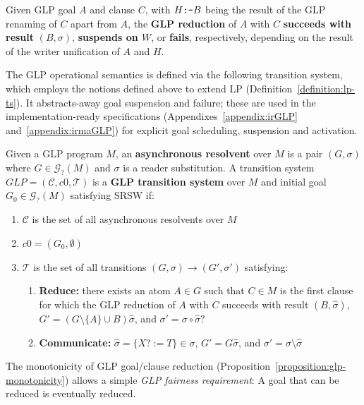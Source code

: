 \documentclass[runningheads,thm-restate]{llncs}
\newcommand{\temph}[1]{\textbf{#1}}  %
\newcommand{\calG}{\mathcal{G}}
\newcommand{\calT}{\mathcal{T}}
\newcommand{\calC}{\mathcal{C}}
\begin{document}
\begin{definition}\label{definition:glp-goal-clause-reduction}
 Given GLP goal $A$ and clause $C$,  with $H \verb|:-| B$ being the result of the GLP renaming of $C$ apart from $A$,
 the \temph{GLP reduction} of $A$ with $C$ \temph{succeeds with result} $(B,\sigma)$,
\temph{suspends on $W$}, or \temph{fails}, respectively, depending on the result of the writer unification of $A$ and $H$.
\end{definition}

The GLP operational semantics is defined via the following transition system, which employs the notions defined above to extend LP (Definition~\ref{definition:lp-ts}). It abstracts-away goal suspension and failure; these are used in the implementation-ready specifications (Appendixes~\ref{appendix:irGLP} and~\ref{appendix:irmaGLP}) for explicit goal scheduling, suspension and activation.
\begin{definition}\label{definition:glp-ts}
Given a GLP program $M$, an \temph{asynchronous resolvent} over $M$ is a pair $(G,\sigma)$ where $G\in \calG_?(M)$ and $\sigma$ is a reader substitution. 
%
A transition system $GLP = (\calC,c0,\calT)$ is a \temph{GLP transition system} over $M$ and initial goal $G_0 \in \mathcal{G}_?(M)$ satisfying SRSW if:
\begin{enumerate}
    \item $\calC$ is the set of all asynchronous resolvents over $M$
    \item $c0= (G_0,\emptyset)$
    \item $\calT$ is the set of all transitions $(G,\sigma)\rightarrow (G',\sigma')$ satisfying:
    \begin{enumerate}
        \item \textbf{Reduce:} there exists an atom $A \in G$ such that $C \in M$ is the first clause for which the GLP reduction of $A$ with $C$ succeeds with result $(B,\hat\sigma)$,  $G' = (G \setminus \{A\} \cup B)\hat\sigma$, and $\sigma' = \sigma \circ \hat\sigma?$
        \item \textbf{Communicate:} $\hat\sigma = \{X?:=T\} \in \sigma$, $G'= G\hat\sigma$, and $\sigma' = \sigma \setminus \hat\sigma$
\end{enumerate}
\end{enumerate}
\end{definition}
The monotonicity of GLP goal/clause reduction (Proposition~\ref{proposition:glp-monotonicity}) allows a simple \emph{GLP fairness requirement}: A goal that can be reduced is eventually reduced.
\end{document}
